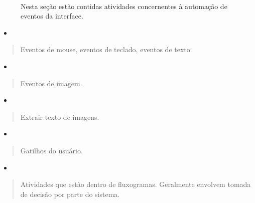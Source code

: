 \documentclass[letterpaper,10pt,brazil]{sphinxmanual}
\begin{document}
\paragraph{}
\label{\detokenize{interface_guide:ui-automation-automacao-de-interface-de-usuario}}
\begin{figure}[htbp]
\centering
\capstart

\noindent{}
\caption{Nesta seção estão contidas atividades concernentes à automação de eventos da interface.}\label{\detokenize{interface_guide:id9}}\end{figure}
\begin{itemize}
\item {} 

\end{itemize}
\begin{quote}

Eventos de mouse, eventos de teclado, eventos de texto.
\end{quote}
\begin{itemize}
\item {} 

\end{itemize}
\begin{quote}

Eventos de imagem.
\end{quote}
\begin{itemize}
\item {} 

\end{itemize}
\begin{quote}

Extrair texto de imagens.
\end{quote}
\begin{itemize}
\item {} 

\end{itemize}
\begin{quote}

Gatilhos do usuário.
\end{quote}
\begin{itemize}
\item {} 

\end{itemize}
\begin{quote}

Atividades que estão dentro de fluxogramas. Geralmente envolvem tomada de decisão por parte do sistema.
\end{quote}
\end{document}
